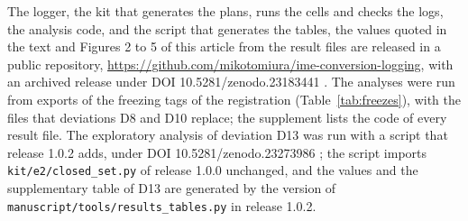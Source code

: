 The logger, the kit that generates the plans, runs the cells and checks the logs, the analysis code, and the script that
generates the tables, the values quoted in the text and Figures 2 to 5 of this article from the result files are
released in a public repository, \url{https://github.com/mikotomiura/ime-conversion-logging}, with an archived release
under DOI 10.5281/zenodo.23183441 \citep{release}. The analyses were run from exports of the freezing tags of the
registration (Table~\ref{tab:freezes}), with the files that deviations D8 and D10 replace; the supplement lists the
code of every result file. The exploratory analysis of deviation D13 was run with a script that release 1.0.2 adds,
under DOI 10.5281/zenodo.23273986 \citep{release102}; the script imports \texttt{kit/e2/closed\_set.py} of release
1.0.0 unchanged, and the values and the supplementary table of D13 are generated by the version of
\texttt{manuscript/tools/results\_tables.py} in release 1.0.2.


